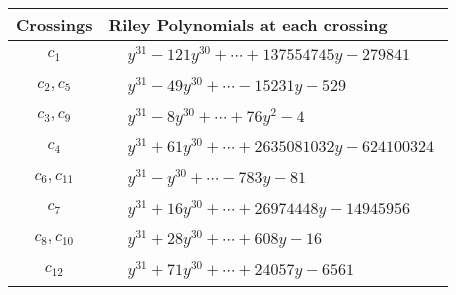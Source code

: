 \documentclass[1p]{elsarticle_modified}
\theoremstyle{definition}
\begin{document}
\begin{tabular}{m{50pt}|m{274pt}}
Crossings & \hspace{64pt}Riley Polynomials at each crossing \\
\hline $$\begin{aligned}c_{1}\end{aligned}$$&$\begin{aligned}
&y^{31}-121 y^{30}+\cdots+137554745 y-279841
\end{aligned}$\\
\hline $$\begin{aligned}c_{2},c_{5}\end{aligned}$$&$\begin{aligned}
&y^{31}-49 y^{30}+\cdots-15231 y-529
\end{aligned}$\\
\hline $$\begin{aligned}c_{3},c_{9}\end{aligned}$$&$\begin{aligned}
&y^{31}-8 y^{30}+\cdots+76 y^2-4
\end{aligned}$\\
\hline $$\begin{aligned}c_{4}\end{aligned}$$&$\begin{aligned}
&y^{31}+61 y^{30}+\cdots+2635081032 y-624100324
\end{aligned}$\\
\hline $$\begin{aligned}c_{6},c_{11}\end{aligned}$$&$\begin{aligned}
&y^{31}- y^{30}+\cdots-783 y-81
\end{aligned}$\\
\hline $$\begin{aligned}c_{7}\end{aligned}$$&$\begin{aligned}
&y^{31}+16 y^{30}+\cdots+26974448 y-14945956
\end{aligned}$\\
\hline $$\begin{aligned}c_{8},c_{10}\end{aligned}$$&$\begin{aligned}
&y^{31}+28 y^{30}+\cdots+608 y-16
\end{aligned}$\\
\hline $$\begin{aligned}c_{12}\end{aligned}$$&$\begin{aligned}
&y^{31}+71 y^{30}+\cdots+24057 y-6561
\end{aligned}$\\
\hline
\end{tabular}\\~\\
\end{document}
